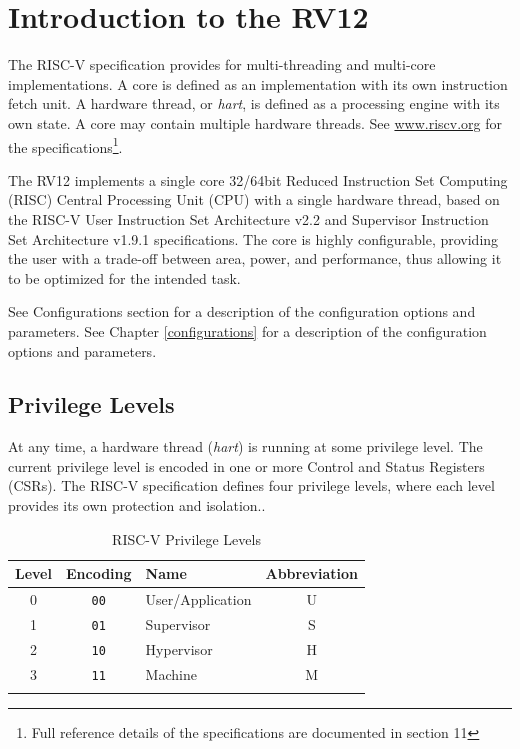 \chapter{Introduction to the RV12} \label{introduction-to-the-rv12}

The RISC-V specification provides for multi-threading and multi-core implementations. 
A core is defined as an implementation with its own instruction fetch unit. 
A hardware thread, or \emph{hart}, is defined as a processing engine with its own state. 
A core may contain multiple hardware threads. 
See \href{http://www.riscv.org}{www.riscv.org} for the specifications\footnote{Full reference details of the specifications are documented in section 11}.

The RV12 implements a single core 32/64bit Reduced Instruction Set Computing (RISC) Central Processing Unit (CPU) with a single hardware thread, based on the RISC-V User Instruction Set Architecture v2.2 and Supervisor Instruction Set Architecture v1.9.1 specifications. 
The core is highly configurable, providing the user with a trade-off between area, power, and performance, thus allowing it to be optimized for the intended task.

\ifdefined\MARKDOWN
	See Configurations section for a description of the configuration options and parameters.
\else
	See Chapter \ref{configurations} for a description of the configuration options and parameters.
\fi

\section{Privilege Levels}\label{privilege-levels}

At any time, a hardware thread (\emph{hart}) is running at some privilege level. 
The current privilege level is encoded in one or more Control and Status Registers (CSRs). 
The RISC-V specification defines four privilege levels, where each level provides its own protection and isolation..

\begin{longtable}[]{@{}cclc@{}}
\toprule
	Level & Encoding    & Name             & Abbreviation\tabularnewline
\midrule
\endhead
	0     & \texttt{00} & User/Application & U\tabularnewline
	1     & \texttt{01} & Supervisor       & S\tabularnewline
	2     & \texttt{10} & Hypervisor       & H\tabularnewline
	3     & \texttt{11} & Machine          & M\tabularnewline
\bottomrule
\caption{RISC-V Privilege Levels}
\label{tab:riscv-priv-levels}
\end{longtable}

